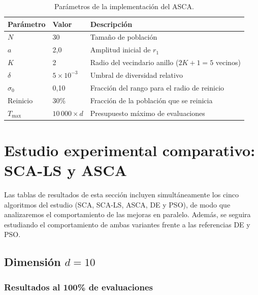 \documentclass[12pt,a4paper]{article}
\begin{document}
\begin{table}[H]
\centering
\renewcommand{\arraystretch}{1.3}
\begin{tabular}{lll}
\toprule
\textbf{Parámetro} & \textbf{Valor} & \textbf{Descripción} \\
\midrule
$N$                & 30                  & Tamaño de población \\
$a$                & 2{,}0               & Amplitud inicial de $r_1$ \\
$K$                & 2                   & Radio del vecindario anillo ($2K+1=5$ vecinos) \\
$\delta$           & $5 \times 10^{-3}$  & Umbral de diversidad relativo \\
$\sigma_0$         & 0{,}10              & Fracción del rango para el radio de reinicio \\
Reinicio           & 30\%                & Fracción de la población que se reinicia \\
$T_{\max}$         & $10\,000 \times d$  & Presupuesto máximo de evaluaciones \\
\bottomrule
\end{tabular}
\caption{Parámetros de la implementación del ASCA.}
\label{tab:parametros_asca}
\end{table}

\section{Estudio experimental comparativo: SCA-LS y ASCA}
\label{sec:exp_sca_ls}
 
Las tablas de resultados de esta sección incluyen simultáneamente los cinco algoritmos del estudio (SCA, SCA-LS, ASCA, DE y PSO), de modo que analizaremos el comportamiento de las mejoras en paralelo. Además, se seguira estudiando el comportamiento de ambas variantes frente a las referencias DE y PSO.
 
\subsection{Dimensión $d = 10$}
 
\subsubsection{Resultados al 100\% de evaluaciones}
 
\end{document}
